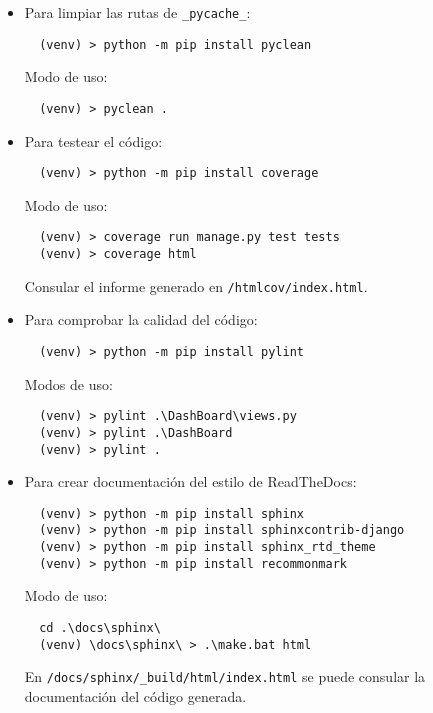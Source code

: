 \begin{itemize}

\item
Para limpiar las rutas de \texttt{\_pycache\_}:

\begin{verbatim}
  (venv) > python -m pip install pyclean
\end{verbatim}

Modo de uso:

\begin{verbatim}
  (venv) > pyclean .
\end{verbatim}

\item
Para testear el código:

\begin{verbatim}
  (venv) > python -m pip install coverage
\end{verbatim}

Modo de uso:

\begin{verbatim}
  (venv) > coverage run manage.py test tests
  (venv) > coverage html
\end{verbatim}


Consular el informe generado en \texttt{/htmlcov/index.html}.

\item
Para comprobar la calidad del código:

\begin{verbatim}
  (venv) > python -m pip install pylint
\end{verbatim}

Modos de uso:

\begin{verbatim}
  (venv) > pylint .\DashBoard\views.py
  (venv) > pylint .\DashBoard
  (venv) > pylint .
\end{verbatim}


\item
Para crear documentación del estilo de ReadTheDocs:

\begin{verbatim}
  (venv) > python -m pip install sphinx
  (venv) > python -m pip install sphinxcontrib-django
  (venv) > python -m pip install sphinx_rtd_theme
  (venv) > python -m pip install recommonmark
\end{verbatim}

Modo de uso:

\begin{verbatim}
  cd .\docs\sphinx\
  (venv) \docs\sphinx\ > .\make.bat html
\end{verbatim}

En \texttt{/docs/sphinx/\_build/html/index.html} se puede consular la documentación del código generada.

\end{itemize}



